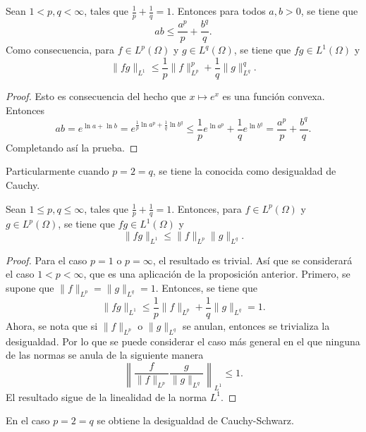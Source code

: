 \begin{proposition}
    Sean $1< p, q< \infty$, tales que $\frac{1}{p} + \frac{1}{q} = 1$.
    Entonces para todos $a, b > 0$, se tiene que 
    \begin{equation*}
        ab \leq \frac{a^p}{p} + \frac{b^q}{q}.
    \end{equation*}
    Como consecuencia, para $f\in L^p(\Omega)$ y $g \in L^q(\Omega)$,
    se tiene que $fg \in L^1(\Omega)$ y 
    \begin{equation*}
        \|fg\|_{L^1} \leq \frac{1}{p}\|f\|^p_{L^p} + \frac{1}{q}
        \|g\|_{L^q}^q.
    \end{equation*}
\end{proposition}
\begin{proof}
    Esto es consecuencia del hecho que $x\mapsto e^x$ es una función
    convexa. Entonces
    \begin{equation*}
        ab = e^{\ln a + \ln b} = e^{\frac{1}{p}\ln a^p + 
        \frac{1}{q}\ln b^q} \leq \frac{1}{p}e^{\ln a^p} +
        \frac{1}{q}e^{\ln b^q} = \frac{a^p}{p} + \frac{b^q}{q}.
    \end{equation*}
    Completando así la prueba.
\end{proof}
Particularmente cuando $p=2=q$, se tiene la conocida como desigualdad de
Cauchy. 
\begin{proposition}
    Sean $1\leq p, q\leq \infty$, tales que $\frac{1}{p} + \frac{1}{q} = 1$.
    Entonces, para $f\in L^p(\Omega)$ y $g\in L^p(\Omega)$, se tiene
    que $fg \in L^1(\Omega)$ y 
    \begin{equation*}
        \|fg\|_{L^1} \leq \|f\|_{L^p}\|g\|_
        {L^q}.
    \end{equation*}
\end{proposition}
\begin{proof}
    Para el caso $p=1$ o $p=\infty$, el resultado es trivial. Así que 
    se considerará el caso $1<p<\infty$, que es una aplicación 
    de la proposición anterior. Primero, se supone
    que $\|f\|_{L^p} = \|g\|_{L^q} = 1$. Entonces, 
    se tiene que
    \begin{equation*}
        \|fg\|_{L^1} \leq \frac{1}{p}\|f\|_{L^p} + \frac{1}{q}\|g\|_{L^q} 
        = 1.
    \end{equation*}
    Ahora, se nota que si $\|f\|_{L^p}$ o $\|g\|_{L^q}$ se anulan, 
    entonces se trivializa la desigualdad. 
    Por lo que se puede considerar el caso más general en el que ninguna de las
    normas se anula de la siguiente manera
    \begin{equation*}
        \left\| \frac{f}{\|f\|_{L^p}} \frac{g}{\|g\|_{L^q}}
        \right\|_{L^1} \leq 1.
    \end{equation*}
    El resultado sigue de la linealidad de la norma $L^1$.
\end{proof}
En el caso $p=2=q$ se obtiene la desigualdad de Cauchy-Schwarz.

